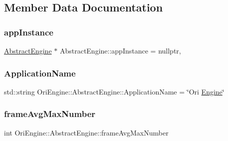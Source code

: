 \subsection{Member Data Documentation}
\hypertarget{class_ori_engine_1_1_abstract_engine_a2a20dacf864ea1a8136e7531fa901932}{}\label{class_ori_engine_1_1_abstract_engine_a2a20dacf864ea1a8136e7531fa901932} 
\subsubsection{\texorpdfstring{app\+Instance}{appInstance}}
{\footnotesize\ttfamily \hyperlink{class_ori_engine_1_1_abstract_engine}{Abstract\+Engine} $\ast$ Abstract\+Engine\+::app\+Instance = nullptr\hspace{0.3cm}{\ttfamily [static]}, {\ttfamily [private]}}

\hypertarget{class_ori_engine_1_1_abstract_engine_a0d5405beaacf6c596046a66986e7573a}{}\label{class_ori_engine_1_1_abstract_engine_a0d5405beaacf6c596046a66986e7573a} 
\subsubsection{\texorpdfstring{Application\+Name}{ApplicationName}}
{\footnotesize\ttfamily std\+::string Ori\+Engine\+::\+Abstract\+Engine\+::\+Application\+Name = \char`\"{}Ori \hyperlink{_skeletal_engine_8cpp_a67e670c1f33b20215b3721b4a515deb2}{Engine}\char`\"{}\hspace{0.3cm}{\ttfamily [private]}}

\hypertarget{class_ori_engine_1_1_abstract_engine_ad6ff48352c89ad50432a017a167dd860}{}\label{class_ori_engine_1_1_abstract_engine_ad6ff48352c89ad50432a017a167dd860} 
\subsubsection{\texorpdfstring{frame\+Avg\+Max\+Number}{frameAvgMaxNumber}}
{\footnotesize\ttfamily int Ori\+Engine\+::\+Abstract\+Engine\+::frame\+Avg\+Max\+Number\hspace{0.3cm}{\ttfamily [private]}}

